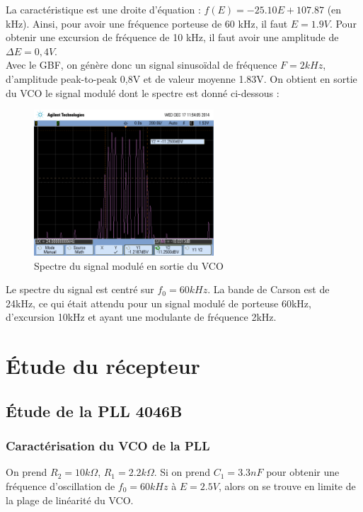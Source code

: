\documentclass[../../Cours_M1.tex]{subfiles}
\begin{document}
La caractéristique est une droite d'équation : $f(E) = -25.10E+107.87$ (en kHz). Ainsi, pour avoir une fréquence porteuse de 60 kHz, il faut $E = 1.9V$. Pour obtenir une excursion de fréquence de 10 kHz, il faut avoir une amplitude de $\Delta E = 0,4V$.\\

Avec le GBF, on génère donc un signal sinusoïdal de fréquence $F=2kHz$, d'amplitude peak-to-peak 0,8V et de valeur moyenne 1.83V. On obtient en sortie du VCO le signal modulé dont le spectre est donné ci-dessous :

\begin{figure}[h!]
\centering
\includegraphics[width=0.6\textwidth]{modVCO.png}
\caption{Spectre du signal modulé en sortie du VCO}
\end{figure}

Le spectre du signal est centré sur $f_0 = 60kHz$. La bande de Carson est de 24kHz, ce qui était attendu pour un signal modulé de porteuse 60kHz, d'excursion 10kHz et ayant une modulante de fréquence 2kHz.

\section{Étude du récepteur}

\subsection{Étude de la PLL 4046B}

\subsubsection{Caractérisation du VCO de la PLL}
On prend $R_2 = 10k\Omega$, $R_1 = 2.2k\Omega$. Si on prend $C_1 = 3.3 nF$ pour obtenir une fréquence d'oscillation de $f_0 = 60 kHz$ à $E=2.5V$, alors on se trouve en limite de la plage de linéarité du VCO. 
\end{document}
